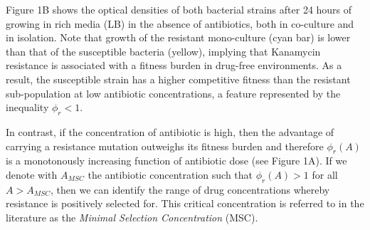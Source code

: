 \documentclass[fleqn,12pt]{wlscirep}
\begin{document}
Figure 1B shows the optical densities of both bacterial strains after 24 hours of growing in rich media (LB) in the absence of antibiotics, both in co-culture and in isolation.  Note that growth of the resistant mono-culture (cyan bar) is lower than that of the susceptible bacteria (yellow), implying that Kanamycin resistance is associated with a fitness burden in drug-free environments\cite{Melnyk2015}. 
As a result, the susceptible strain has a higher competitive fitness than the resistant sub-population at low antibiotic concentrations, a feature represented by the inequality $\phi_r<1$.



In contrast, if the concentration of antibiotic is high, then the advantage of carrying a resistance mutation outweighs its fitness burden and therefore $\phi_r(A)$ is a monotonously increasing function of antibiotic dose (see Figure 1A).  If we denote with $A_{MSC}$ the antibiotic concentration such that $\phi_r(A) > 1$ for all $A > A_{MSC}$, then we can identify the range of drug concentrations whereby resistance is positively selected for. This critical concentration is referred to in the literature as the {\em Minimal Selection Concentration}\cite{Gullberg2011} (MSC).


\clearpage
\end{document}
